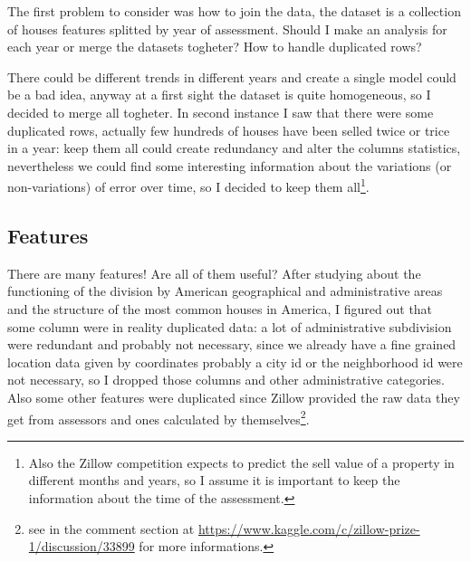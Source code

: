 The first problem to consider was how to join the data, the dataset is a collection of houses features splitted by year of assessment. Should I make an analysis for each year or merge the datasets togheter? How to handle duplicated rows?
    
There could be different trends in different years and create a single model could be a bad idea, anyway at a first sight the dataset is quite homogeneous, so I decided to merge all togheter. In second instance I saw that there were some duplicated rows, actually few hundreds of houses have been selled twice or trice in a year: keep them all could create redundancy and alter the columns statistics, nevertheless we could find some interesting information about the variations (or non-variations) of error over time, so I decided to keep them all\footnote{
    Also the Zillow competition expects to predict the sell value of a property in different months and years, so I assume it is important to keep the information about the time of the assessment.
    }.

\subsection{Features}

There are many features! Are all of them useful? After studying about the functioning of the division by American geographical and administrative areas and the structure of the most common houses in America, I figured out that some column were in reality duplicated data: a lot of administrative subdivision were redundant and probably not necessary, since we already have a fine grained location data given by coordinates probably a city id or the neighborhood id were not necessary, so I dropped those columns and other administrative categories. Also some other features were duplicated since Zillow provided the raw data they get from assessors and ones calculated by themselves\footnote{see in the comment section at \url{https://www.kaggle.com/c/zillow-prize-1/discussion/33899} for more informations.}.

